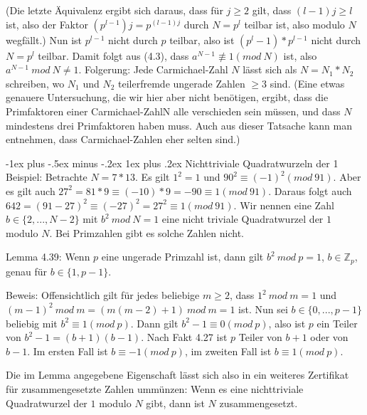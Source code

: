 \documentclass[a4paper]{article}
\makeatletter
\renewcommand{\subsubsection}{\@startsection{subsubsection}{3}{0mm}%
 {-1ex plus -.5ex minus -.2ex}%
 {1ex plus .2ex}%
 {\normalfont\small\bfseries}}
\makeatother
\begin{document}
\begin{multicols}{3}
        (Die letzte Äquivalenz ergibt sich daraus, dass für $j\geq 2$ gilt, dass $(l-1)j\geq l$ ist, also der Faktor $(p^{l-1})j=p^{(l-1)j}$ durch $N=p^l$ teilbar ist, also modulo $N$ wegfällt.) Nun ist $p^{l-1}$ nicht durch $p$ teilbar, also ist $(p^l-1)*p^{l-1}$ nicht durch $N=p^l$ teilbar. Damit folgt aus (4.3), dass $a^{N-1}\not\equiv 1 (mod\ N)$ ist, also $a^{N-1}\ mod\ N\not= 1$.
        Folgerung: Jede Carmichael-Zahl $N$ lässt sich als $N=N_1 *N_2$ schreiben, wo $N_1$ und $N_2$ teilerfremde ungerade Zahlen $\geq 3$ sind.
        (Eine etwas genauere Untersuchung, die wir hier aber nicht benötigen, ergibt, dass die Primfaktoren einer Carmichael-ZahlN alle verschieden sein müssen, und dass $N$ mindestens drei Primfaktoren haben muss. Auch aus dieser Tatsache kann man entnehmen, dass Carmichael-Zahlen eher selten sind.)

        \subsubsection{Nichttriviale Quadratwurzeln der 1}
        Beispiel: Betrachte $N=7*13$. Es gilt $1^2 = 1$ und $90^2 \equiv(-1)^2 (mod\ 91)$. Aber es gilt auch $27^2 = 81* 9 \equiv(-10)*9 = -90\equiv 1(mod\ 91)$. Daraus folgt auch $642 =(91-27)^2 \equiv (-27)^2 = 27^2 \equiv 1 (mod\ 91)$. Wir nennen eine Zahl $b\in\{2,...,N-2\}$ mit $b^2\ mod\ N=1$ eine nicht triviale Quadratwurzel der $1$ modulo $N$. Bei Primzahlen gibt es solche Zahlen nicht.

        Lemma 4.39: Wenn $p$ eine ungerade Primzahl ist, dann gilt $b^2\ mod\ p = 1$, $b \in\mathbb{Z}_p$, genau für $b\in\{1 ,p-1\}$.

        Beweis: Offensichtlich gilt für jedes beliebige $m\geq 2$, dass $1^2\ mod\ m= 1$ und $(m-1)^2\ mod\ m= (m(m-2)+1)\ mod\ m= 1$ ist. Nun sei $b\in\{0 ,...,p-1\}$ beliebig mit $b^2\equiv 1(mod\ p)$. Dann gilt $b^2-1 \equiv 0 (mod\ p)$, also ist $p$ ein Teiler von $b^2-1 =(b+1)(b-1)$. Nach Fakt 4.27 ist $p$ Teiler von $b+1$ oder von $b-1$. Im ersten Fall ist $b\equiv -1 (mod\ p)$, im zweiten Fall ist $b\equiv 1(mod\ p)$.

        Die im Lemma angegebene Eigenschaft lässt sich also in ein weiteres Zertifikat für zusammengesetzte Zahlen ummünzen:
        Wenn es eine nichttriviale Quadratwurzel der $1$ modulo $N$ gibt, dann ist $N$ zusammengesetzt.


\end{multicols}
\end{document}
